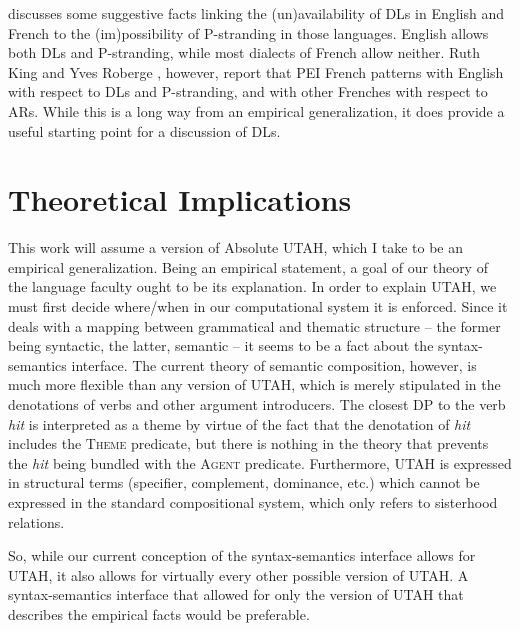 \documentclass[letterpaper]{article}
\begin{document}
\textcite{milway2015generals} discusses some suggestive facts linking the (un)availability of DLs in English and French to the (im)possibility of P-stranding in those languages.
English allows both DLs and P-stranding, while most dialects  of French allow neither.
Ruth King and Yves Roberge \parencite[p.c. cited in][pp 253--254]{rooryck1996prepositions}, however, report that PEI French patterns with English with respect to DLs and P-stranding, and with other Frenches with respect to ARs.
While this is a long way from an empirical generalization, it does provide a useful starting point for a discussion of DLs.
\section{Theoretical Implications}
This work will assume a version of  Absolute UTAH, which I take to be an empirical generalization.
Being an empirical statement, a goal of our theory of the language faculty ought to be its explanation.
In order to explain UTAH, we must first decide where/when in our computational system it is enforced.
Since it deals with a mapping between grammatical and thematic structure -- the former being syntactic, the latter, semantic -- it seems to be a fact about the syntax-semantics interface.
The current theory of semantic composition, however, is much more flexible than any version of UTAH, which is merely stipulated in the denotations of verbs and other argument introducers.
The closest DP to the verb \textit{hit} is interpreted as a theme by virtue of the fact that the denotation of \textit{hit} includes the \textsc{Theme} predicate, but there is nothing in the theory that prevents the \textit{hit} being bundled with the \textsc{Agent} predicate.
Furthermore, UTAH is expressed in structural terms (specifier, complement, dominance, etc.) which cannot be expressed in the standard compositional system, which only refers to sisterhood relations. 

So, while our current conception of the syntax-semantics interface allows for UTAH, it also allows for virtually every other possible version of UTAH.
A syntax-semantics interface that allowed for only the version of UTAH that describes the empirical facts would be preferable.

\printbibliography
\end{document}
